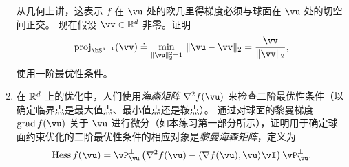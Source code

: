\documentclass[../../book-main_zh.tex]{subfiles}
\begin{document}
\begin{exercise}
\begin{enumerate}
        从几何上讲，这表示 $f$ 在 $\vu$ 处的欧几里得梯度必须与球面在 $\vu$ 处的切空间正交。
        现在假设 $\vv \in \R^d$ 非零。证明
        \begin{equation*}
            \mathrm{proj}_{\bS^{d-1}}(\vv) \doteq
            \min_{\norm{\vu}_2^2 = 1}\, \norm{\vu - \vv}_2 
            =
            \frac{\vv}{\norm{\vv}_2},
        \end{equation*}
        使用一阶最优性条件。
        \item 在 $\mathbb{R}^d$ 上的优化中，人们使用\textit{海森矩阵} $\nabla^2 f(\vu)$ 来检查二阶最优性条件（以确定临界点是最大值点、最小值点还是鞍点）。
        通过对球面的黎曼梯度 $\mathrm{grad}\, f(\vu)$ 关于 $\vu$ 进行微分（如本练习第一部分所示），证明用于确定球面约束优化的二阶最优性条件的相应对象是\textit{黎曼海森矩阵}，定义为
        \begin{equation}\label{eq:exercise-riemann-hess-sphere}
            \mathrm{Hess}\, f(\vu) = \vP_{\vu}^\perp \left( 
            \nabla^2 f(\vu) - \ip{\nabla f(\vu)}{\vu} \vI
            \right) \vP_{\vu}^\perp.
        \end{equation}
    \end{enumerate}
\end{exercise}
\end{document}
